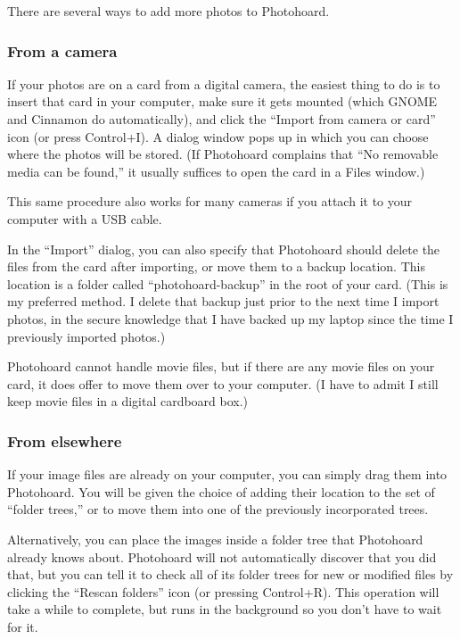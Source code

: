 \documentclass[11pt]{report}
\begin{document}
There are several ways to add more photos to Photohoard.

\subsubsection{From a camera}

If your photos are on a card from a digital camera, the easiest thing
to do is to insert that card in your computer, make sure it gets
mounted (which GNOME and Cinnamon do automatically), and click the
``Import from camera or card'' icon (or press Control+I). A dialog
window pops up in which you can choose where the photos will be
stored. (If Photohoard complains that ``No removable media can be
found,'' it usually suffices to open the card in a Files window.)

This same procedure also works for many cameras if you attach it to
your computer with a USB cable.

In the ``Import'' dialog, you can also specify that Photohoard should
delete the files from the card after importing, or move them to a
backup location. This location is a folder called
``photohoard-backup'' in the root of your card. (This is my preferred
method. I delete that backup just prior to the next time I import
photos, in the secure knowledge that I have backed up my laptop since
the time I previously imported photos.)

Photohoard cannot handle movie files, but if there are any movie files
on your card, it does offer to move them over to your computer. (I have
to admit I still keep movie files in a digital cardboard box.)

\subsubsection{From elsewhere}

If your image files are already on your computer, you can simply drag
them into Photohoard. You will be given the choice of adding their
location to the set of ``folder trees,'' or to move them into one of
the previously incorporated trees.

Alternatively, you can place the images inside a folder tree that
Photohoard already knows about. Photohoard will not automatically
discover that you did that, but you can tell it to check all of its folder
trees for new or modified files by clicking the ``Rescan folders''
icon (or pressing Control+R). This operation will take a while to
complete, but runs in the background so you don't have to wait for it.
\end{document}
